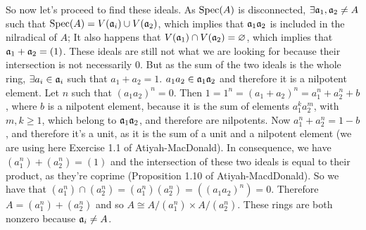 \begin{sol}
	So now let's proceed to find these ideals. As $\mathrm{Spec}(A)$ is disconnected, $\exists \mathfrak{a}_1, \mathfrak{a}_2 \neq A$ such that $\mathrm{Spec}(A) = V(\mathfrak{a}_i) \cup V(\mathfrak{a}_2)$, which implies that $\mathfrak{a}_1 \mathfrak{a}_2$ is included in the nilradical of $A$; It also happens that $V(\mathfrak{a}_1) \cap V(\mathfrak{a}_2) = \varnothing$, which implies that $\mathfrak{a}_1 + \mathfrak{a}_2 = (1)$. These ideals are still not what we are looking for because their intersection is not necessarily $0$. But as the sum of the two ideals is the whole ring, $\exists a_i \in \mathfrak{a}_i$ such that $a_1 + a_2 = 1$. $a_1a_2 \in \mathfrak{a}_1 \mathfrak{a}_2$ and therefore it is a nilpotent element. Let $n$ such that $(a_1a_2)^n = 0$. Then $1 = 1^n = (a_1+a_2)^n = a_1^n + a_2^n + b$, where $b$ is a nilpotent element, because it is the sum of elements $a_1^k a_2^m$, with $m, k \geq 1$, which belong to $\mathfrak{a}_1 \mathfrak{a}_2$, and therefore are nilpotents. Now $a_1^n + a_2^n = 1-b$, and therefore it's a unit, as it is the sum of a unit and a nilpotent element (we are using here Exercise 1.1 of Atiyah-MacDonald). In consequence, we have $(a_1^n) + (a_2^n) = (1)$ and the intersection of these two ideals is equal to their product, as they're coprime (Proposition 1.10 of Atiyah-MacdDonald). So we have that $(a_1^n) \cap (a_2^n) = (a_1^n)(a_2^n) = ((a_1a_2)^n) = 0$. Therefore $A = (a_1^n) + (a_2^n)$ and so $A \cong A/(a_1^n) \times A/(a_2^n)$. These rings are both nonzero because $\mathfrak{a}_i \neq A$.

\end{sol}
